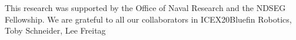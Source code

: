 






\begin{acknowledgments}
This research was supported by the Office of Naval Research and the NDSEG Fellowship. We are grateful to all our collaborators in ICEX20\textemdash Bluefin Robotics, Toby Schneider, Lee Freitag \textemdash 
\end{acknowledgments}

